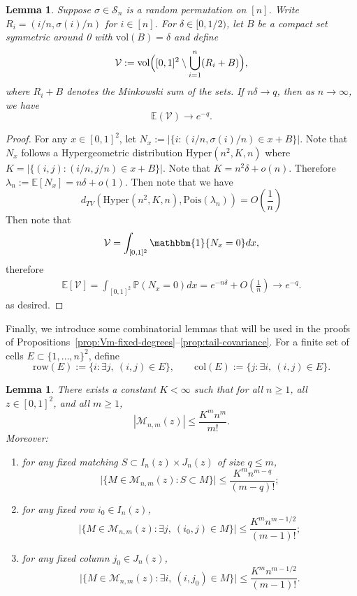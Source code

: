 \documentclass[11pt]{article}
\newtheorem{lemma}[thm]{Lemma}
\newcommand{\E}{\mathbb{E}}
\newcommand{\cM}{\mathcal{M}}
\newcommand{\vol}{\mathrm{vol}}
\newcommand{\abs}[1]{| #1|}
\newcommand{\bone}{\mathbbm{1}}
\begin{document}
\begin{lemma}
\label{le: VacancyLimit}
Suppose $\sigma\in\mathcal{S}_n$ is a random permutation on $[n]$. Write $R_i = (i/n, \sigma(i)/n)$ for $i\in[n]$. For $\delta\in[0, 1/2)$, let $B$ be a compact set symmetric around 0 with $\vol(B) = \delta$ and define
\[
    \mathcal{V}:=\vol\Bigl([0,1]^2\setminus \bigcup_{i=1}^n (R_i + B)\Bigr),
\]
where $R_i + B$ denotes the Minkowski sum of the sets. If $n\delta\to q$, then as $n\to\infty$, we have 
\[
    \mathbb{E}(\mathcal{V}) \to e^{-q}.
\]
\end{lemma}
\begin{proof}
    For any $x\in[0, 1]^2$, let $N_x := \abs{\{i: (i/n, \sigma(i)/n)\in x+B\}}$. Note that $N_x$ follows a Hypergeometric distribution $\mathrm{Hyper}(n^2, K, n)$ where $K = \abs{\{(i,j):(i/n, j/n)\in x + B\}}$. Note that $K = n^2\delta + o(n)$. Therefore $\lambda_n := \E[N_x] = n\delta + o(1)$. Then note that we have 
    \[
    d_{TV}(\mathrm{Hyper}(n^2, K, n), \mathrm{Pois}(\lambda_n)) = O(\frac{1}{n})
    \]
    Then note that 
    \begin{align*}
        \mathcal{V} = \int_{[0,1]^2}\bone\{N_x = 0\}dx,
    \end{align*}
    therefore
    \begin{align*}
        \E[\mathcal{V}] = \int_{[0,1]^2}\mathbb{P}(N_x = 0)dx = e^{-n\delta} + O(\frac{1}{n}) \to e^{-q}.
    \end{align*}
    as desired.
\end{proof}



Finally, we introduce some combinatorial lemmas that will be used in the proofs of Propositions~\ref{prop:Vm-fixed-degrees}--\ref{prop:tail-covariance}. For a finite set of cells $E\subset\{1,\dots,n\}^2$, define
\[
\mathrm{row}(E):=\{i:\exists j,\ (i,j)\in E\},
\qquad
\mathrm{col}(E):=\{j:\exists i,\ (i,j)\in E\}.
\]

\begin{lemma}\label{lem:matchingcount}
There exists a constant $K<\infty$ such that for all $n\ge1$, all $z\in[0,1]^2$,
and all $m\ge1$,
\[
|\cM_{n,m}(z)|\le \frac{K^m n^m}{m!}.
\]
Moreover:
\begin{enumerate}[label=\rm(\alph*), ref = \thelemma(\alph*), itemsep=0.2em]
\item \label{lem:matchingcount_a} for any fixed matching $S\subset I_n(z)\times J_n(z)$ of size $q\le m$,
\[
\bigl|\{M\in\cM_{n,m}(z): S\subset M\}\bigr|
\le \frac{K^m n^{m-q}}{(m-q)!};
\]

\item \label{lem:matchingcount_b} for any fixed row $i_0\in I_n(z)$,
\[
\bigl|\{M\in\cM_{n,m}(z): \exists j,\ (i_0,j)\in M\}\bigr|
\le \frac{K^m n^{m-1/2}}{(m-1)!};
\]
\item \label{lem:matchingcount_c} for any fixed column $j_0\in J_n(z)$,
\[
\bigl|\{M\in\cM_{n,m}(z): \exists i,\ (i,j_0)\in M\}\bigr|
\le \frac{K^m n^{m-1/2}}{(m-1)!}.
\]
\end{enumerate}
\end{lemma}
\end{document}
